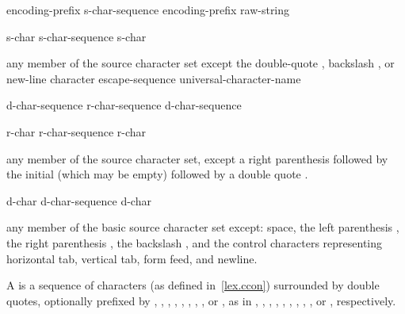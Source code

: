 %
\begin{bnf}
\br
    encoding-prefix\opt {} s-char-sequence\opt {}\br
    encoding-prefix\opt {} raw-string
\end{bnf}

\begin{bnf}
\br
    s-char\br
    s-char-sequence s-char
\end{bnf}

\begin{bnftab}
\br
\>\textnormal{any member of the source character set except}\br
\>\>\textnormal{the double-quote , backslash \terminal{\textbackslash}, or new-line character}\br
\>escape-sequence\br
\>universal-character-name
\end{bnftab}

\begin{bnf}
\br
     d-char-sequence\opt \terminal{(} r-char-sequence\opt \terminal{)} d-char-sequence\opt {}
\end{bnf}

\begin{bnf}
\br
    r-char\br
    r-char-sequence r-char
\end{bnf}

\begin{bnftab}
\br
\>\textnormal{any member of the source character set, except}\br
\>\>\textnormal{a right parenthesis \terminal{)} followed by the initial }\br
\>\>\textnormal{(which may be empty) followed by a double quote .}
\end{bnftab}

\begin{bnf}
\br
    d-char\br
    d-char-sequence d-char
\end{bnf}

\begin{bnftab}
\br
\>\textnormal{any member of the basic source character set except:}\br
\>\>\textnormal{space, the left parenthesis \terminal{(}, the right parenthesis \terminal{)}, the backslash \terminal{\textbackslash},}\br
\>\>\textnormal{and the control characters representing horizontal tab,}\br
\>\>\textnormal{vertical tab, form feed, and newline.}
\end{bnftab}

\pnum
{}%
%
%
%
%
%
A  is a sequence of characters (as defined
in~\ref{lex.ccon}) surrounded by double quotes, optionally prefixed by
,
,
,
,
,
,
,
,
or ,
as in
,
,
,
,
,
,
,
,
,
or ,
respectively.

